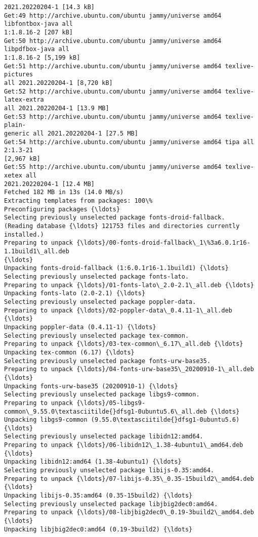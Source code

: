 \documentclass[11pt]{article}
\begin{document}
\begin{Verbatim}[commandchars=\\\{\}]
2021.20220204-1 [14.3 kB]
Get:49 http://archive.ubuntu.com/ubuntu jammy/universe amd64 libfontbox-java all
1:1.8.16-2 [207 kB]
Get:50 http://archive.ubuntu.com/ubuntu jammy/universe amd64 libpdfbox-java all
1:1.8.16-2 [5,199 kB]
Get:51 http://archive.ubuntu.com/ubuntu jammy/universe amd64 texlive-pictures
all 2021.20220204-1 [8,720 kB]
Get:52 http://archive.ubuntu.com/ubuntu jammy/universe amd64 texlive-latex-extra
all 2021.20220204-1 [13.9 MB]
Get:53 http://archive.ubuntu.com/ubuntu jammy/universe amd64 texlive-plain-
generic all 2021.20220204-1 [27.5 MB]
Get:54 http://archive.ubuntu.com/ubuntu jammy/universe amd64 tipa all 2:1.3-21
[2,967 kB]
Get:55 http://archive.ubuntu.com/ubuntu jammy/universe amd64 texlive-xetex all
2021.20220204-1 [12.4 MB]
Fetched 182 MB in 13s (14.0 MB/s)
Extracting templates from packages: 100\%
Preconfiguring packages {\ldots}
Selecting previously unselected package fonts-droid-fallback.
(Reading database {\ldots} 121753 files and directories currently installed.)
Preparing to unpack {\ldots}/00-fonts-droid-fallback\_1\%3a6.0.1r16-1.1build1\_all.deb
{\ldots}
Unpacking fonts-droid-fallback (1:6.0.1r16-1.1build1) {\ldots}
Selecting previously unselected package fonts-lato.
Preparing to unpack {\ldots}/01-fonts-lato\_2.0-2.1\_all.deb {\ldots}
Unpacking fonts-lato (2.0-2.1) {\ldots}
Selecting previously unselected package poppler-data.
Preparing to unpack {\ldots}/02-poppler-data\_0.4.11-1\_all.deb {\ldots}
Unpacking poppler-data (0.4.11-1) {\ldots}
Selecting previously unselected package tex-common.
Preparing to unpack {\ldots}/03-tex-common\_6.17\_all.deb {\ldots}
Unpacking tex-common (6.17) {\ldots}
Selecting previously unselected package fonts-urw-base35.
Preparing to unpack {\ldots}/04-fonts-urw-base35\_20200910-1\_all.deb {\ldots}
Unpacking fonts-urw-base35 (20200910-1) {\ldots}
Selecting previously unselected package libgs9-common.
Preparing to unpack {\ldots}/05-libgs9-common\_9.55.0\textasciitilde{}dfsg1-0ubuntu5.6\_all.deb {\ldots}
Unpacking libgs9-common (9.55.0\textasciitilde{}dfsg1-0ubuntu5.6) {\ldots}
Selecting previously unselected package libidn12:amd64.
Preparing to unpack {\ldots}/06-libidn12\_1.38-4ubuntu1\_amd64.deb {\ldots}
Unpacking libidn12:amd64 (1.38-4ubuntu1) {\ldots}
Selecting previously unselected package libijs-0.35:amd64.
Preparing to unpack {\ldots}/07-libijs-0.35\_0.35-15build2\_amd64.deb {\ldots}
Unpacking libijs-0.35:amd64 (0.35-15build2) {\ldots}
Selecting previously unselected package libjbig2dec0:amd64.
Preparing to unpack {\ldots}/08-libjbig2dec0\_0.19-3build2\_amd64.deb {\ldots}
Unpacking libjbig2dec0:amd64 (0.19-3build2) {\ldots}

\end{Verbatim}
\end{document}
